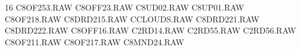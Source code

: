 16
C8OF253.RAW
C8OFF23.RAW
C8UD02.RAW
C8UP01.RAW
C8OF218.RAW
C8DRD215.RAW
CCLOUDS.RAW
C8DRD221.RAW
C8DRD222.RAW
C8OFF16.RAW
C2RD14.RAW
C2RD55.RAW
C2RD56.RAW
C8OF211.RAW
C8OF217.RAW
C8MND24.RAW
